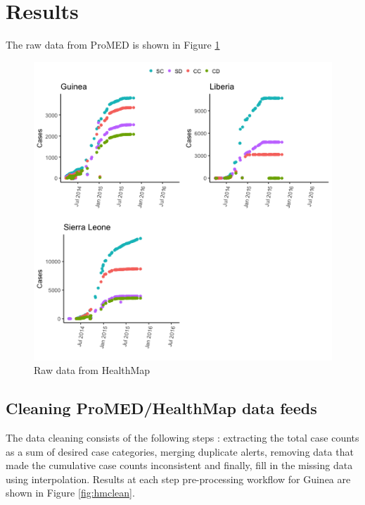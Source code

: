 \documentclass[]{article}
\begin{document}
\section{Results}\label{results}

The raw data from ProMED is shown in Figure \ref{fig:hmraw}

\begin{figure}

{\centering \includegraphics[width=6.67in]{figures/promed_raw} 

}

\caption{Raw data from HealthMap}\label{fig:hmraw}
\end{figure}

\subsection{Cleaning ProMED/HealthMap data
feeds}\label{cleaning-promedhealthmap-data-feeds}

The data cleaning consists of the following steps : extracting the total
case counts as a sum of desired case categories, merging duplicate
alerts, removing data that made the cumulative case counts inconsistent
and finally, fill in the missing data using interpolation. Results at
each step pre-processing workflow for Guinea are shown in Figure
\ref{fig:hmclean}.
\end{document}
